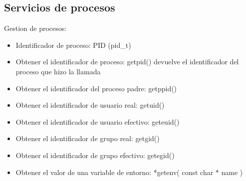 \documentclass[12pt, letterpaper]{article}
\begin{document}
\subsection{Servicios de procesos}

Gestion de procesos:

\begin{itemize}
	\item{Identificador de proceso: PID (pid\_t)}
	\item{Obtener el identificador de proceso: getpid() devuelve el identificador del proceso que hizo la llamada}
	\item{Obtener el identificador del proceso padre: getppid()}
	\item{Obtener el identificador de usuario real: getuid()}
	\item{Obtener el identificador de usuario efectivo: geteuid()}
	\item{Obtener el identificador de grupo real: getgid()}
	\item{Obtener el identificador de grupo efectivo: getegid()}
	\item{Obtener el valor de una variable de entorno: *getenv( const char * name )}
\end{itemize}
\end{document}
